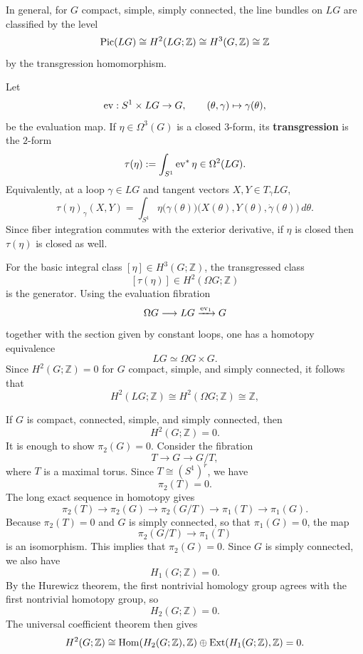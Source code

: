 \documentclass[12pt]{article}
\begin{document}
In general, for $G$ compact, simple, simply connected, the line bundles on $LG$ are classified by the level
\[
\operatorname{Pic}(LG)\cong H^2(LG;\mathbb Z)\cong H^3(G,\mathbb{Z}) \cong \mathbb Z
\] by the transgression homomorphism. 
\begin{remark}
Let
\[
\operatorname{ev}:S^1\times LG\to G,\qquad (\theta,\gamma)\mapsto \gamma(\theta),
\]
be the evaluation map. If \(\eta\in \Omega^3(G)\) is a closed \(3\)-form, its \textbf{transgression} is the \(2\)-form
\[
\tau(\eta):=\int_{S^1}\operatorname{ev}^*\eta \in \Omega^2(LG).
\]
Equivalently, at a loop \(\gamma\in LG\) and tangent vectors \(X,Y\in T_\gamma LG\),
\[
\tau(\eta)_\gamma(X,Y)
=
\int_{S^1}
\eta\bigl(\gamma(\theta)\bigr)\bigl(X(\theta),Y(\theta),\dot\gamma(\theta)\bigr)\,d\theta.
\]
Since fiber integration commutes with the exterior derivative,
if \(\eta\) is closed then \(\tau(\eta)\) is closed as well.

For the basic integral class \([\eta]\in H^3(G;\mathbb Z)\), the transgressed class
\[
[\tau(\eta)]\in H^2(\Omega G;\mathbb Z)
\]
is the generator. Using the evaluation fibration
\[
\Omega G \longrightarrow LG \xrightarrow{\operatorname{ev}_1} G
\]
together with the section given by constant loops, one has a homotopy equivalence
\[
LG\simeq \Omega G\times G.
\]
Since \(H^2(G;\mathbb Z)=0\) for \(G\) compact, simple, and simply connected, it follows that
\[
H^2(LG;\mathbb Z)\cong H^2(\Omega G;\mathbb Z)\cong \mathbb Z,
\]
\end{remark}

\begin{remark}
If \(G\) is compact, connected, simple, and simply connected, then
\[
H^2(G;\mathbb Z)=0.
\]
It is enough to show $\pi_2(G)=0$.
Consider the fibration
\[
T \longrightarrow G \longrightarrow G/T,
\]
where \(T\) is a maximal torus. Since \(T\cong (S^1)^r\), we have
\[
\pi_2(T)=0.
\]
The long exact sequence in homotopy gives
\[
\pi_2(T)\longrightarrow \pi_2(G)\longrightarrow \pi_2(G/T)\longrightarrow \pi_1(T)\longrightarrow \pi_1(G).
\]
Because \(\pi_2(T)=0\) and \(G\) is simply connected, so that \(\pi_1(G)=0\), the map
\[
\pi_2(G/T)\longrightarrow \pi_1(T)
\]
is an isomorphism. This implies that \(\pi_2(G)=0\). Since \(G\) is simply connected, we also have
\[
H_1(G;\mathbb Z)=0.
\]
By the Hurewicz theorem, the first nontrivial homology group agrees with the first nontrivial homotopy group, so
\[H_2(G;\mathbb Z)=0.
\]
The universal coefficient theorem then gives
\[
H^2(G;\mathbb Z)
\cong
\operatorname{Hom}(H_2(G;\mathbb Z),\mathbb Z)\oplus \operatorname{Ext}(H_1(G;\mathbb Z),\mathbb Z)
=0.
\]
\end{remark}
\end{document}
